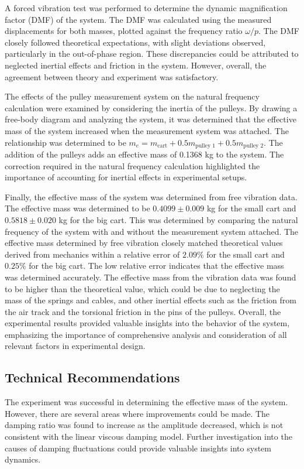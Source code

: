 A forced vibration test was performed to determine the dynamic magnification factor (DMF) of the system. The DMF was calculated using the measured displacements for both masses, plotted against the frequency ratio $\omega/p$. The DMF closely followed theoretical expectations, with slight deviations observed, particularly in the out-of-phase region. These discrepancies could be attributed to neglected inertial effects and friction in the system. However, overall, the agreement between theory and experiment was satisfactory.

The effects of the pulley measurement system on the natural frequency calculation were examined by considering the inertia of the pulleys. By drawing a free-body diagram and analyzing the system, it was determined that the effective mass of the system increased when the measurement system was attached. The relationship was determined to be $m_e = m_{\text{cart}} + 0.5 m_{\text{pulley 1}} + 0.5 m_{\text{pulley 2}}$. The addition of the pulleys adds an effective mass of 0.1368 kg to the system. The correction required in the natural frequency calculation highlighted the importance of accounting for inertial effects in experimental setups.

Finally, the effective mass of the system was determined from free vibration data. The effective mass was determined to be $0.4099 \pm 0.009$ kg for the small cart and $0.5818 \pm 0.020$ kg for the big cart. This was determined by comparing the natural frequency of the system with and without the measurement system attached. The effective mass determined by free vibration closely matched theoretical values derived from mechanics within a relative error of $2.09\%$ for the small cart and $0.25\%$ for the big cart. The low relative error indicates that the effective mass was determined accurately. The effective mass from the vibration data was found to be higher than the theoretical value, which could be due to neglecting the mass of the springs and cables, and other inertial effects such as the friction from the air track and the torsional friction in the pins of the pulleys. Overall, the experimental results provided valuable insights into the behavior of the system, emphasizing the importance of comprehensive analysis and consideration of all relevant factors in experimental design.

\subsection{Technical Recommendations}
The experiment was successful in determining the effective mass of the system. However, there are several areas where improvements could be made. The damping ratio was found to increase as the amplitude decreased, which is not consistent with the linear viscous damping model. Further investigation into the causes of damping fluctuations could provide valuable insights into system dynamics. 

